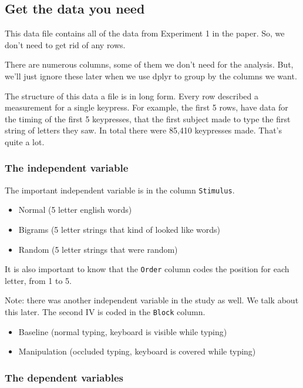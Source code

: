 \documentclass[]{book}
\providecommand{\tightlist}{%
  \setlength{\itemsep}{0pt}\setlength{\parskip}{0pt}}
\theoremstyle{definition}
\theoremstyle{definition}
\theoremstyle{definition}
\theoremstyle{remark}
\begin{document}
\subsection{Get the data you need}\label{get-the-data-you-need-1}

This data file contains all of the data from Experiment 1 in the paper.
So, we don't need to get rid of any rows.

There are numerous columns, some of them we don't need for the analysis.
But, we'll just ignore these later when we use dplyr to group by the
columns we want.

The structure of this data a file is in long form. Every row described a
measurement for a single keypress. For example, the first 5 rows, have
data for the timing of the first 5 keypresses, that the first subject
made to type the first string of letters they saw. In total there were
85,410 keypresses made. That's quite a lot.

\subsubsection{The independent
variable}\label{the-independent-variable-1}

The important independent variable is in the column \texttt{Stimulus}.

\begin{itemize}
\tightlist
\item
  Normal (5 letter english words)
\item
  Bigrams (5 letter strings that kind of looked like words)
\item
  Random (5 letter strings that were random)
\end{itemize}

It is also important to know that the \texttt{Order} column codes the
position for each letter, from 1 to 5.

Note: there was another independent variable in the study as well. We
talk about this later. The second IV is coded in the \texttt{Block}
column.

\begin{itemize}
\tightlist
\item
  Baseline (normal typing, keyboard is visible while typing)
\item
  Manipulation (occluded typing, keyboard is covered while typing)
\end{itemize}

\subsubsection{The dependent variables}\label{the-dependent-variables}
\end{document}
